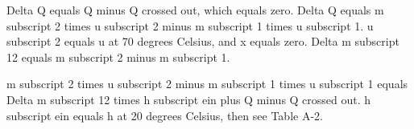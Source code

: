 Delta Q equals Q minus Q crossed out, which equals zero.
Delta Q equals m subscript 2 times u subscript 2 minus m subscript 1 times u subscript 1.
u subscript 2 equals u at 70 degrees Celsius, and x equals zero.
Delta m subscript 12 equals m subscript 2 minus m subscript 1.

m subscript 2 times u subscript 2 minus m subscript 1 times u subscript 1 equals Delta m subscript 12 times h subscript ein plus Q minus Q crossed out.
h subscript ein equals h at 20 degrees Celsius, then see Table A-2.